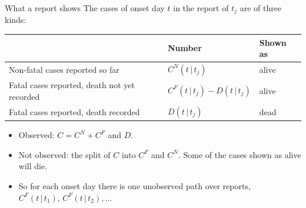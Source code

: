 \documentclass[aspectratio=169,9pt]{beamer}
\newcommand{\given}{\,|\,}
\begin{document}
\begin{frame}{What a report shows}
The cases of onset day $t$ in the report of $t_j$ are of three kinds:

\medskip
\begin{center}
\renewcommand{\arraystretch}{1.4}
\begin{tabular}{lll}
\toprule
 & Number & Shown as \\
\midrule
Non-fatal cases reported so far & $C^{N}(t\given t_j)$ & alive \\
Fatal cases reported, death not yet recorded & $C^{F}(t\given t_j)-D(t\given t_j)$ & alive \\
Fatal cases reported, death recorded & $D(t\given t_j)$ & dead \\
\bottomrule
\end{tabular}
\end{center}

\bigskip
\begin{itemize}
\item Observed: $C=C^{N}+C^{F}$ and $D$.
\item Not observed: the split of $C$ into $C^{F}$ and $C^{N}$. Some of the
cases shown as alive will die.
\item So for each onset day there is one unobserved path over reports,
$C^{F}(t\given t_1),\,C^{F}(t\given t_2),\dots$
\end{itemize}
\end{frame}
\end{document}

